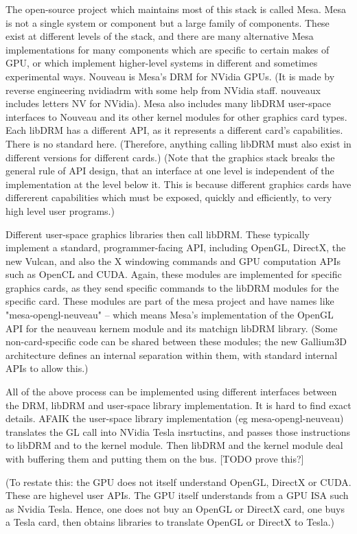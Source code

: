 \documentclass[oneside,english]{scrbook}
\begin{document}
The open-source project which maintains most of this stack is called Mesa. Mesa is not a single system or component but a large family of components. These exist at different levels of the stack, and there are many alternative Mesa implementations for many components which are specific to certain makes of GPU, or which implement higher-level systems in different and sometimes experimental ways.   Nouveau is Mesa's DRM for NVidia GPUs. (It is made by reverse engineering nvidiadrm with some help from NVidia staff. nouveaux includes letters NV for NVidia).  Mesa also includes many libDRM user-space interfaces to Nouveau and its other kernel modules for other graphics card types.   Each libDRM has a different API, as it represents a different card's capabilities. There is no standard here. (Therefore, anything calling libDRM must also exist in different versions for different cards.) (Note that the graphics stack breaks the general rule of API design, that an interface at one level is independent of the implementation at the level below it.  This is because different graphics cards have differerent capabilities which must be exposed, quickly and efficiently, to very high level user programs.)

Different user-space graphics libraries then call libDRM.   These typically implement a standard, programmer-facing API, including OpenGL, DirectX, the new Vulcan, and also the X windowing commands and GPU computation APIs such as OpenCL and CUDA.  Again, these modules are implemented for specific graphics cards, as they send specific commands to the libDRM modules for the specific card.  These modules are part of the mesa project and have names like "mesa-opengl-neuveau" -- which means Mesa's implementation of the OpenGL API for the neauveau kernem module and its matchign libDRM library.   (Some non-card-specific code can be shared between these modules; the new Gallium3D architecture defines an internal separation within them, with standard internal APIs to allow this.)

All of the above process can be implemented using different interfaces between the DRM, libDRM and user-space library implementation.   It is hard to find exact details. AFAIK the user-space library implementation (eg mesa-opengl-neuveau) translates the GL call into NVidia Tesla insrtuctins, and passes those instructions to libDRM and to the kernel module. Then libDRM and the kernel module deal with buffering them and putting them on the bus. [TODO prove this?]

(To restate this: the GPU does not itself understand OpenGL, DirectX or CUDA.  These are highevel user APIs. The GPU itself understands from a GPU ISA such as Nvidia Tesla. Hence, one does not buy an OpenGL or DirectX card, one buys a Tesla card, then obtains libraries to translate OpenGL or DirectX to Tesla.)
\end{document}
